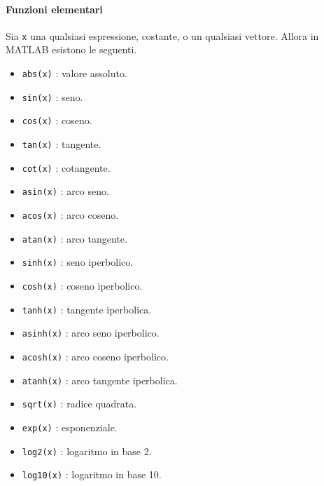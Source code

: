 \documentclass[12pt,a4paper,oneside]{book}
\begin{document}
\paragraph{Funzioni elementari}
Sia \texttt{x} una qualsiasi espressione, costante, o un qualsiasi vettore. Allora in MATLAB esistono le seguenti.
\begin{itemize}	
	
	\item	\texttt{abs(x)} : valore assoluto.
	
	\item	\texttt{sin(x)} : seno.
	
	\item	\texttt{cos(x)} : coseno.
	
	\item	\texttt{tan(x)} : tangente.
	
	\item	\texttt{cot(x)} : cotangente.
	
	\item	\texttt{asin(x)} : arco seno.
	
	\item	\texttt{acos(x)} : arco coseno.
	
	\item	\texttt{atan(x)} : arco tangente.
	
	\item	\texttt{sinh(x)} : seno iperbolico.
	
	\item	\texttt{cosh(x)} : coseno iperbolico.
	
	\item	\texttt{tanh(x)} : tangente iperbolica.
	
	\item	\texttt{asinh(x)} : arco seno iperbolico.
	
	\item	\texttt{acosh(x)} : arco coseno iperbolico.
	
	\item	\texttt{atanh(x)} : arco tangente iperbolica.
	
	\item	\texttt{sqrt(x)} : radice quadrata.
	
	\item	\texttt{exp(x)} : esponenziale.
	
	\item	\texttt{log2(x)} : logaritmo in base 2.

	\item	\texttt{log10(x)} : logaritmo in base 10.
	

\end{itemize}
\end{document}
